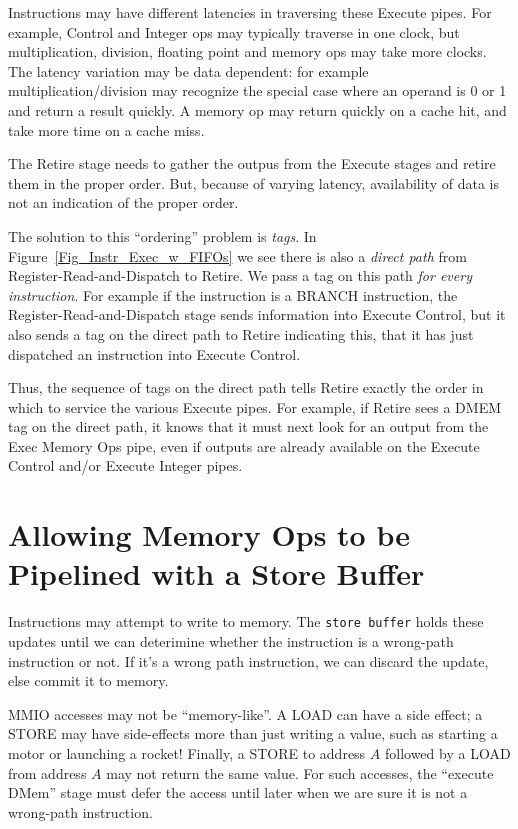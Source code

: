 Instructions may have different latencies in traversing these Execute
pipes.  For example, Control and Integer ops may typically traverse in
one clock, but multiplication, division, floating point and memory ops
may take more clocks.  The latency variation may be data dependent:
for example multiplication/division may recognize the special case
where an operand is 0 or 1 and return a result quickly.  A memory op
may return quickly on a cache hit, and take more time on a cache miss.

The Retire stage needs to gather the outpus from the Execute stages
and retire them in the proper order.  But, because of varying latency,
availability of data is not an indication of the proper order.

The solution to this ``ordering'' problem is \emph{tags}.  In
Figure~\ref{Fig_Instr_Exec_w_FIFOs} we see there is also a
\emph{direct path} from Register-Read-and-Dispatch to Retire.  We pass
a tag on this path \emph{for every instruction}.  For example if the
instruction is a BRANCH instruction, the Register-Read-and-Dispatch
stage sends information into Execute Control, but it also sends a tag
on the direct path to Retire indicating this, {\ie} that it has just
dispatched an instruction into Execute Control.

Thus, the sequence of tags on the direct path tells Retire exactly the
order in which to service the various Execute pipes.  For example, if
Retire sees a DMEM tag on the direct path, it knows that it must next
look for an output from the Exec Memory Ops pipe, even if outputs are
already available on the Execute Control and/or Execute Integer pipes.


\section{Allowing Memory Ops to be Pipelined with a Store Buffer}

\label{Sec_Store_Buffers}

Instructions may attempt to write to memory. The {\tt store
    buffer} holds these updates until we can deterimine whether the
    instruction is a wrong-path instruction or not.  If it's a wrong
    path instruction, we can discard the update, else commit it to
    memory.

MMIO accesses may not be ``memory-like''.  A LOAD can have a
  side effect; a STORE may have side-effects more than just writing a
  value, such as starting a motor or launching a rocket!  Finally, a
  STORE to address $A$ followed by a LOAD from address $A$ may not
  return the same value.  For such accesses, the ``execute DMem''
  stage must defer the access until later when we are sure it is not a
  wrong-path instruction.

